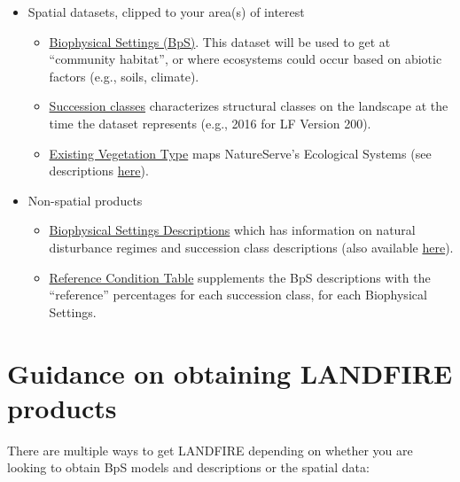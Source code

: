 \documentclass[
]{book}
\providecommand{\tightlist}{%
  \setlength{\itemsep}{0pt}\setlength{\parskip}{0pt}}
\begin{document}
\begin{itemize}
\tightlist
\item
  Spatial datasets, clipped to your area(s) of interest

  \begin{itemize}
  \tightlist
  \item
    \href{https://www.landfire.gov/bps.php}{Biophysical Settings (BpS)}. This dataset will be used to get at ``community habitat'', or where ecosystems could occur based on abiotic factors (e.g., soils, climate).
  \item
    \href{https://www.landfire.gov/sclass.php}{Succession classes} characterizes structural classes on the landscape at the time the dataset represents (e.g., 2016 for LF Version 200).
  \item
    \href{https://www.landfire.gov/evt.php}{Existing Vegetation Type} maps NatureServe's Ecological Systems (see descriptions \href{https://www.landfire.gov/documents/LANDFIRE_Ecological_Systems_Descriptions_CONUS.pdf}{here}).
  \end{itemize}
\item
  Non-spatial products

  \begin{itemize}
  \tightlist
  \item
    \href{http://landfirereview.org/search.php}{Biophysical Settings Descriptions} which has information on natural disturbance regimes and succession class descriptions (also available \href{https://tnc.box.com/s/d3ocvy969s1792m5885filjhktujp86e}{here}).\\
  \item
    \href{https://tnc.box.com/s/d3ocvy969s1792m5885filjhktujp86e}{Reference Condition Table} supplements the BpS descriptions with the ``reference'' percentages for each succession class, for each Biophysical Settings.
  \end{itemize}
\end{itemize}

\hypertarget{guidance-on-obtaining-landfire-products}{%
\section{Guidance on obtaining LANDFIRE products}\label{guidance-on-obtaining-landfire-products}}

There are multiple ways to get LANDFIRE depending on whether you are looking to obtain BpS models and descriptions or the spatial data:
\end{document}
